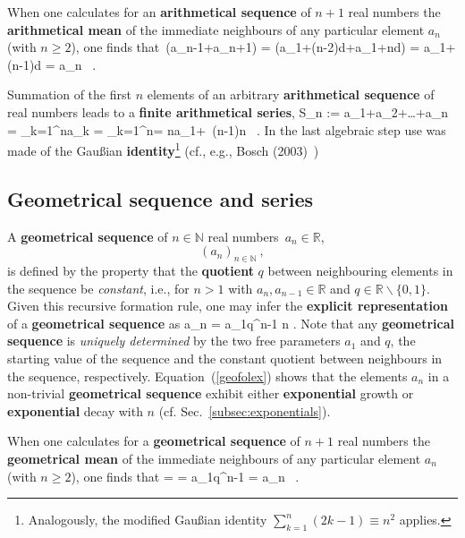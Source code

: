 \medskip
\noindent
When one calculates for an {\bf arithmetical sequence} of $n+1$ 
real numbers the {\bf arithmetical mean} of the immediate 
neighbours of any particular element $a_{n}$ (with $n \geq 2$), 
one finds that
%
\be
{}\,(a_{n-1}+a_{n+1})
= \left(a_{1}+(n-2)d+a_{1}+nd\right)
= a_{1}+(n-1)d
= a_{n} \ .
\ee
%

\medskip
\noindent
Summation of the first $n$ elements of an arbitrary {\bf 
arithmetical sequence} of real numbers leads to a {\bf finite 
arithmetical series},
%
\be
S_{n} := a_{1}+a_{2}+\ldots+a_{n} = \sum_{k=1}^{n}a_{k}
= \sum_{k=1}^{n}\left[a_{1} + (k-1)d\right]
= na_{1}+ \,(n-1)n \ .
\ee
%
In the last algebraic step use was made of the Gau\ss ian {\bf 
identity}\footnote{Analogously, the modified Gau\ss ian identity 
$\displaystyle \sum_{k=1}^{n}(2k-1) \equiv n^{2}$ applies.} (cf., 
e.g., Bosch (2003)~)
%
\be
{}
\ee
%

\subsection{Geometrical sequence and series}
A {\bf geometrical sequence} of $n \in \mathbb{N}$ real 
numbers~$a_{n} \in \mathbb{R}$,
%
\[
(a_{n})_{n \in \mathbb{N}} \ ,
\]
%
is defined by the property that the {\bf quotient} $q$ between 
neighbouring elements in the sequence be \emph{constant}, i.e., 
for $n>1$
%
\be
{}
\ee
%
with $a_{n}, a_{n-1} \in \mathbb{R}$ and $q \in 
\mathbb{R}\backslash\{0,1\}$. Given this recursive formation rule, 
one may infer the {\bf explicit representation} of a {\bf 
geometrical sequence} as
%
\be
{}
a_{n} = a_{1}q^{n-1}
\quad{}\quad
n \in {}.
\ee
%
Note that any {\bf geometrical sequence} is \emph{uniquely 
determined} by the two free parameters $a_{1}$ and $q$, the 
starting value of the sequence and the constant quotient between 
neighbours in the sequence, respectively. 
Equation~(\ref{geofolex}) shows that the elements $a_{n}$ in a 
non-trivial {\bf geometrical sequence} exhibit either {\bf 
exponential} growth or {\bf exponential} decay with $n$ (cf. 
Sec.~\ref{subsec:exponentials}).

\medskip
\noindent
When one calculates for a {\bf geometrical sequence} of $n+1$ real 
numbers the {\bf geometrical mean} of the immediate neighbours of 
any particular element $a_{n}$ (with $n \geq 2$), one finds that
%
\be
{}
= 
= a_{1}q^{n-1}
= a_{n} \ .
\ee
%

